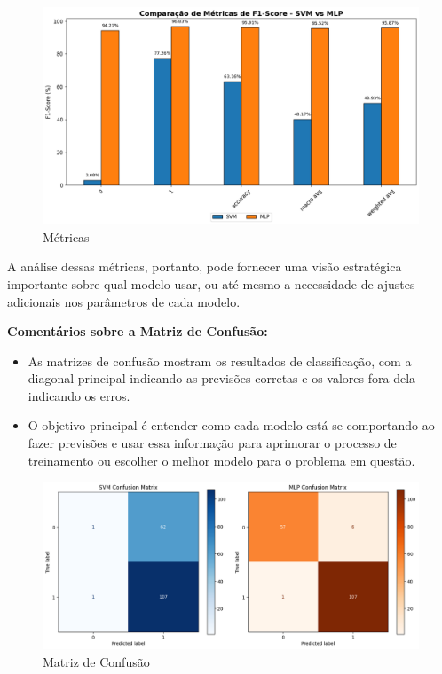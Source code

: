 \documentclass[12pt,a4paper,oneside,openany]{article}
\begin{document}
\begin{figure}[h]
    \centering
    \includegraphics[width=0.8\linewidth]{graficos/metricas.png}
    \caption{Métricas}
    \label{fig:m´rtricas}
\end{figure}
\noindent 
A análise dessas métricas, portanto, pode fornecer uma visão estratégica importante sobre qual modelo usar, ou até mesmo a necessidade de ajustes adicionais nos parâmetros de cada modelo.

\noindent \textbf{Comentários sobre a Matriz de Confusão:}
\begin{itemize}
    \item As matrizes de confusão mostram os resultados de classificação, com a diagonal principal indicando as previsões corretas e os valores fora dela indicando os erros.
    \item O objetivo principal é entender como cada modelo está se comportando ao fazer previsões e usar essa informação para aprimorar o processo de treinamento ou escolher o melhor modelo para o problema em questão.
\end{itemize}

\noindent
\begin{figure}[h]
    \centering
    \includegraphics[width=0.8\linewidth]{graficos/matrix_confusao_sem_otimizacao.png}
    \caption{Matriz de Confusão}
    \label{fig:matriz_confusao}
\end{figure}
\end{document}

